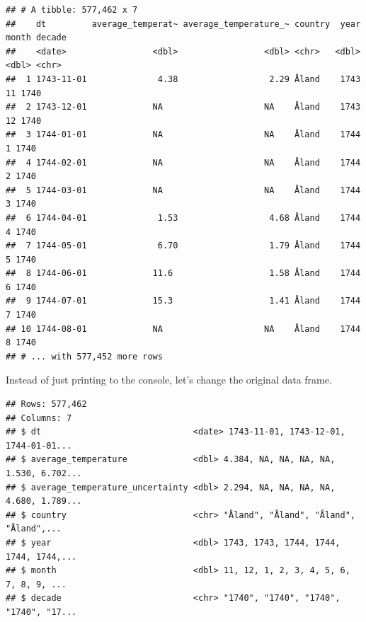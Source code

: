 \documentclass[
]{book}
\newenvironment{Shaded}{\begin{snugshade}}{\end{snugshade}}
\newcommand{\CharTok}[1]{\textcolor[rgb]{0.31,0.60,0.02}{#1}}
\newcommand{\CommentTok}[1]{\textcolor[rgb]{0.56,0.35,0.01}{\textit{#1}}}
\newcommand{\DataTypeTok}[1]{\textcolor[rgb]{0.13,0.29,0.53}{#1}}
\newcommand{\KeywordTok}[1]{\textcolor[rgb]{0.13,0.29,0.53}{\textbf{#1}}}
\newcommand{\NormalTok}[1]{#1}
\newcommand{\OperatorTok}[1]{\textcolor[rgb]{0.81,0.36,0.00}{\textbf{#1}}}
\newcommand{\StringTok}[1]{\textcolor[rgb]{0.31,0.60,0.02}{#1}}
\begin{document}
\begin{verbatim}
## # A tibble: 577,462 x 7
##    dt         average_temperat~ average_temperature_~ country  year month decade
##    <date>                 <dbl>                 <dbl> <chr>   <dbl> <dbl> <chr> 
##  1 1743-11-01              4.38                  2.29 Åland    1743    11 1740  
##  2 1743-12-01             NA                    NA    Åland    1743    12 1740  
##  3 1744-01-01             NA                    NA    Åland    1744     1 1740  
##  4 1744-02-01             NA                    NA    Åland    1744     2 1740  
##  5 1744-03-01             NA                    NA    Åland    1744     3 1740  
##  6 1744-04-01              1.53                  4.68 Åland    1744     4 1740  
##  7 1744-05-01              6.70                  1.79 Åland    1744     5 1740  
##  8 1744-06-01             11.6                   1.58 Åland    1744     6 1740  
##  9 1744-07-01             15.3                   1.41 Åland    1744     7 1740  
## 10 1744-08-01             NA                    NA    Åland    1744     8 1740  
## # ... with 577,452 more rows
\end{verbatim}

Instead of just printing to the console, let's change the original data frame.

\begin{Shaded}
\end{Shaded}

\begin{verbatim}
## Rows: 577,462
## Columns: 7
## $ dt                              <date> 1743-11-01, 1743-12-01, 1744-01-01...
## $ average_temperature             <dbl> 4.384, NA, NA, NA, NA, 1.530, 6.702...
## $ average_temperature_uncertainty <dbl> 2.294, NA, NA, NA, NA, 4.680, 1.789...
## $ country                         <chr> "Åland", "Åland", "Åland", "Åland",...
## $ year                            <dbl> 1743, 1743, 1744, 1744, 1744, 1744,...
## $ month                           <dbl> 11, 12, 1, 2, 3, 4, 5, 6, 7, 8, 9, ...
## $ decade                          <chr> "1740", "1740", "1740", "1740", "17...
\end{verbatim}
\end{document}
